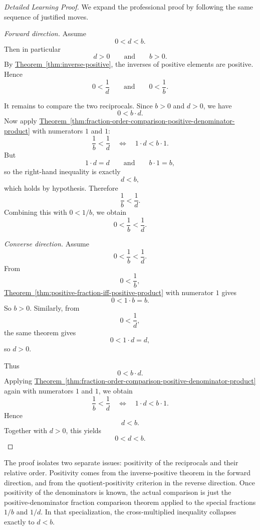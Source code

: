 \begin{proof}[Detailed Learning Proof]
\LRAProofBodyStart
We expand the professional proof by following the same sequence of justified moves.

\emph{Forward direction.} Assume
\[
0<d<b.
\]
Then in particular
\[
d>0
\qquad\text{and}\qquad
b>0.
\]
By \hyperref[thm:inverse-positive]{Theorem~\ref*{thm:inverse-positive}},
the inverses of positive elements are positive.  Hence
\[
0<\frac{1}{d}
\qquad\text{and}\qquad
0<\frac{1}{b}.
\]

It remains to compare the two reciprocals.  Since $b>0$ and $d>0$, we have
\[
0<b\cdot d.
\]
Now apply
\hyperref[thm:fraction-order-comparison-positive-denominator-product]{Theorem~\ref*{thm:fraction-order-comparison-positive-denominator-product}}
with numerators $1$ and $1$:
\[
\frac{1}{b}<\frac{1}{d}
\quad\Longleftrightarrow\quad
1\cdot d<b\cdot 1.
\]
But
\[
1\cdot d=d
\qquad\text{and}\qquad
b\cdot 1=b,
\]
so the right-hand inequality is exactly
\[
d<b,
\]
which holds by hypothesis.  Therefore
\[
\frac{1}{b}<\frac{1}{d}.
\]
Combining this with $0<1/b$, we obtain
\[
0<\frac{1}{b}<\frac{1}{d}.
\]

\emph{Converse direction.} Assume
\[
0<\frac{1}{b}<\frac{1}{d}.
\]
From
\[
0<\frac{1}{b},
\]
\hyperref[thm:positive-fraction-iff-positive-product]{Theorem~\ref*{thm:positive-fraction-iff-positive-product}}
with numerator $1$ gives
\[
0<1\cdot b=b.
\]
So $b>0$.  Similarly, from
\[
0<\frac{1}{d},
\]
the same theorem gives
\[
0<1\cdot d=d,
\]
so $d>0$.

Thus
\[
0<b\cdot d.
\]
Applying
\hyperref[thm:fraction-order-comparison-positive-denominator-product]{Theorem~\ref*{thm:fraction-order-comparison-positive-denominator-product}}
again with numerators $1$ and $1$, we obtain
\[
\frac{1}{b}<\frac{1}{d}
\quad\Longleftrightarrow\quad
1\cdot d<b\cdot 1.
\]
Hence
\[
d<b.
\]
Together with $d>0$, this yields
\[
0<d<b.
\]
\end{proof}

\begin{remark*}
The proof isolates two separate issues: positivity of the reciprocals and
their relative order.  Positivity comes from the inverse-positive theorem in
the forward direction, and from the quotient-positivity criterion in the
reverse direction.  Once positivity of the denominators is known, the actual
comparison is just the positive-denominator fraction comparison theorem
applied to the special fractions $1/b$ and $1/d$.  In that specialization,
the cross-multiplied inequality collapses exactly to $d<b$.
\end{remark*}

